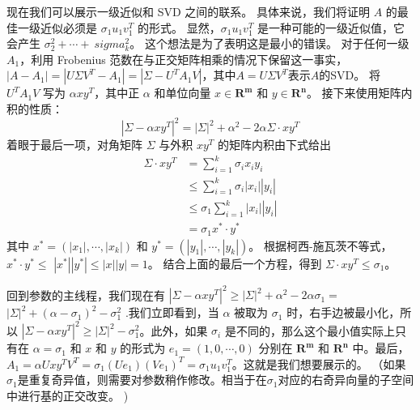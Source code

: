 \documentclass[11pt,a4paper,twoside]{article}
\begin{document}
\begin{CJK}{UTF8}{gbsn}
现在我们可以展示一级近似和 SVD 之间的联系。 具体来说，我们将证明 $A$ 的最佳一级近似必须是 $\sigma_{1} u_{1} v_{1}^{T}$ 的形式。 显然，$\sigma_{1} u_{1} v_{1}^{T}$ 是一种可能的一级近似值，它会产生 $\sigma_{2}^{2}+\cdots+\ sigma_{k}^{2}$。 这个想法是为了表明这是最小的错误。 对于任何一级 $A_{1}$，利用 Frobenius 范数在与正交矩阵相乘的情况下保留这一事实，$\left|A-A_{1}\right|=\left|U \Sigma V^{T }-A_{1}\right|=\left|\Sigma-U^{T} A_{1} V\right|$，其中$A=U \Sigma V^{T}$表示$A$的SVD。 将 $U^{T} A_{1} V$ 写为 $\alpha x y^{T}$，其中正 $\alpha$ 和单位向量 $x \in \mathbf{R}^{\mathbf{m}}$ 和 $y \in \mathbf{R}^{\mathbf{n}}$。 接下来使用矩阵内积的性质：
$$
\left|\Sigma-\alpha x y^{T}\right|^{2}=|\Sigma|^{2}+\alpha^{2}-2 \alpha \Sigma \cdot x y^{T}
$$
着眼于最后一项，对角矩阵 $\Sigma$ 与外积 $x y^{T}$ 的矩阵内积由下式给出
$$
\begin{aligned}
\Sigma \cdot x y^{T} &=\sum_{i=1}^{k} \sigma_{i} x_{i} y_{i} \\
& \leq \sum_{i=1}^{k} \sigma_{i}\left|x_{i}\right|\left|y_{i}\right| \\
& \leq \sigma_{1} \sum_{i=1}^{k}\left|x_{i}\right|\left|y_{i}\right| \\
&=\sigma_{1} x^{*} \cdot y^{*}
\end{aligned}
$$
其中 $x^{*}=\left(\left|x_{1}\right|, \cdots,\left|x_{k}\right|\right)$ 和 $y^{*}=\left( \left|y_{1}\right|, \cdots,\left|y_{k}\right|\right)$。 根据柯西-施瓦茨不等式，$x^{*} \cdot y^{*} \leq$ $\left|x^{*}\right|\left|y^{*}\right| \leq|x||y|=1$。 结合上面的最后一个方程，得到 $\Sigma \cdot x y^{T} \leq \sigma_{1}$。

回到参数的主线程，我们现在有 $\left|\Sigma-\alpha x y^{T}\right|^{2} \geq|\Sigma|^{2}+\alpha^{2} -2 \alpha \sigma_{1}=$ $|\Sigma|^{2}+\left(\alpha-\sigma_{1}\right)^{2}-\sigma_{1}^{2}$ .我们立即看到，当 $\alpha$ 被取为 $\sigma_{1}$ 时，右手边被最小化，所以 $\left|\Sigma-\alpha x y^{T}\right|^{2 } \geq|\Sigma|^{2}-\sigma_{1}^{2}$。此外，如果 $\sigma_{i}$ 是不同的，那么这个最小值实际上只有在 $\alpha=\sigma_{1}$ 和 $x$ 和 $y$ 的形式为 $e_{1}=( 1,0, \cdots, 0)$ 分别在 $\mathbf{R}^{\mathbf{m}}$ 和 $\mathbf{R}^{\mathbf{n}}$ 中。最后，$A_{1}=\alpha U x y^{T} V^{T}=\sigma_{1}\left(U e_{1}\right)\left(V e_{1}\right)^ {T}=\sigma_{1} u_{1} v_{1}^{T}$。这就是我们想要展示的。 （如果$\sigma_{1}$是重复奇异值，则需要对参数稍作修改。相当于在$\sigma_{1}$对应的右奇异向量的子空间中进行基的正交改变。 )


\end{CJK}
\end{document}
